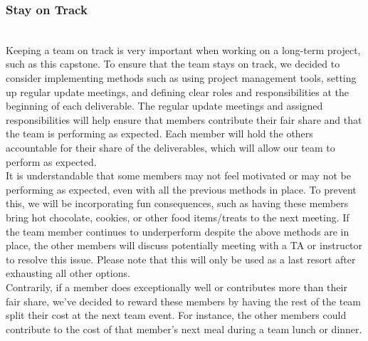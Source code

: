 \documentclass{article}
\begin{document}
{\subsubsection*{Stay on Track}



 \\

Keeping a team on track is very important when working on a long-term project,
 such as this capstone. To ensure that the team stays on track, we decided to
 consider implementing methods such as using project management tools, setting
 up regular update meetings, and defining clear roles and responsibilities at
 the beginning of each deliverable. The regular update meetings and assigned
 responsibilities will help ensure that members contribute their fair share 
 and that the team is performing as expected. Each member will hold the others
 accountable for their share of the deliverables, which will allow our team 
 to perform as expected. \\

It is understandable that some members may not feel motivated or may not be
 performing as expected, even with all the previous methods in place.
 To prevent this, we will be incorporating fun consequences,
 such as having these members bring hot chocolate, cookies,
 or other food items/treats to the next meeting.
 If the team member continues to underperform despite the above
 methods are in place, the other members will discuss potentially 
 meeting with a TA or instructor to resolve this issue. 
 Please note that this will only be used as a last
 resort after exhausting all other options. \\

Contrarily, if a member does exceptionally well or contributes more 
than their fair share, we’ve decided to reward these members by having 
the rest of the team split their cost at the next team event. 
For instance, the other members could contribute to the cost of 
that member’s next meal during a team lunch or dinner. \\

}
\end{document}

